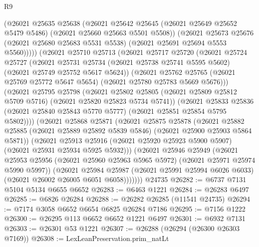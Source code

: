 \begin{lexlean}{R9}
\begin{coremodule}
{{{{{{{{{{{{{{{{{{{{{{{{{{{{{{{{{{{{{{{{{{{{{{{{{{{{{{{{{{{{{{{{{{{{{{{{{{{{{{{{{{{{            (@26021
              @25635
              @25638
              (@26021
                @25642
                @25645
                (@26021 @25649 @25652 @5479 @5486)
                (@26021 @25660 @25663 @5501 @5508))
              (@26021
                @25673
                @25676
                (@26021 @25680 @25683 @5531 @5538)
                (@26021 @25691 @25694 @5553 @5560)))))
        (@26021
          @25710
          @25713
          (@26021
            @25717
            @25720
            (@26021
              @25724
              @25727
              (@26021
                @25731
                @25734
                (@26021 @25738 @25741 @5595 @5602)
                (@26021 @25749 @25752 @5617 @5624))
              (@26021
                @25762
                @25765
                (@26021 @25769 @25772 @5647 @5654)
                (@26021 @25780 @25783 @5669 @5676)))
            (@26021
              @25795
              @25798
              (@26021
                @25802
                @25805
                (@26021 @25809 @25812 @5709 @5716)
                (@26021 @25820 @25823 @5734 @5741))
              (@26021
                @25833
                @25836
                (@26021 @25840 @25843 @5770 @5777)
                (@26021 @25851 @25854 @5795 @5802))))
          (@26021
            @25868
            @25871
            (@26021
              @25875
              @25878
              (@26021
                @25882
                @25885
                (@26021 @25889 @25892 @5839 @5846)
                (@26021 @25900 @25903 @5864 @5871))
              (@26021
                @25913
                @25916
                (@26021 @25920 @25923 @5900 @5907)
                (@26021 @25931 @25934 @5925 @5932)))
            (@26021
              @25946
              @25949
              (@26021
                @25953
                @25956
                (@26021 @25960 @25963 @5965 @5972)
                (@26021 @25971 @25974 @5990 @5997))
              (@26021
                @25984
                @25987
                (@26021 @25991 @25994 @6026 @6033)
                (@26021 @26002 @26005 @6051 @6058)))))))
    @24735
@26282 := @6737 @7131 @5104 @5134 @6655 @6652
@26283 := @6463 @1221
@26284 := @26283 @6497
@26285 := @6826 @26284
@26288 := @26282 @26285 (@11541 @24735)
@26294 := @7174 @3058 @6652 @6654 @6825 @26284 @7186
@26295 := @7156 @1222
@26300 := @26295 @113 @6652 @6652 @1221 @6497
@26301 := @6932 @7131
@26303 := @26301 @53 @1221
@26307 := @26288 (@26294 (@26300 @26303 @7169))
@26308 := LexLeanPreservation.prim_natLt
}}}}}}}}}}}}}}}}}}}}}}}}}}}}}}}}}}}}}}}}}}}}}}}}}}}}}}}}}}}}}}}}}}}}}}}}}}}}}}}}}}}}
\end{coremodule}
\end{lexlean}
